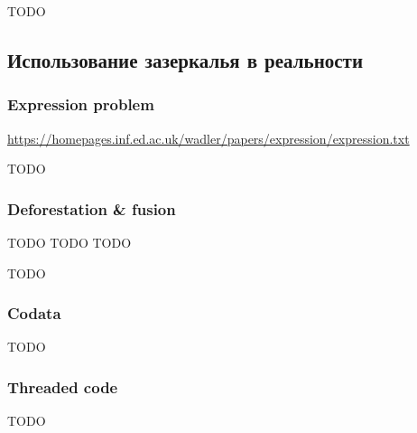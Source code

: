 TODO %


\subsection{Использование зазеркалья в реальности}

\subsubsection{Expression problem}

\url{https://homepages.inf.ed.ac.uk/wadler/papers/expression/expression.txt}



TODO %

\subsubsection{Deforestation \& fusion}

TODO\cite{wadler1988deforestation,gill1993short} %
TODO\cite{meijer1991functional}
TODO\cite{coutts2007stream} %






TODO %

\subsubsection{Codata}




TODO %

\subsubsection{Threaded code}

TODO %

